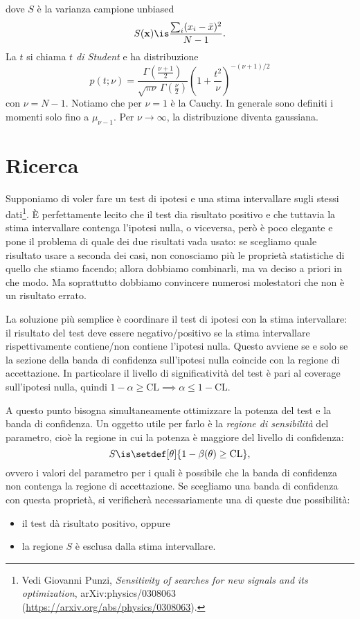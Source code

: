 dove $S$ è la varianza campione unbiased
\begin{equation*}
	S(\mathbf x)
	\is \frac {\sum_i (x_i-\bar x)^2} {N-1}.
\end{equation*}
La $t$ si chiama \emph{$t$ di Student} e ha distribuzione
\begin{equation*}
	p(t;\nu)
	= \frac {\Gamma\left(\frac{\nu+1}2\right)} {\sqrt{\pi\nu}\, \Gamma\left(\frac\nu2\right)}
	\left(1+\frac{t^2}\nu\right)^{-(\nu+1)/2}
\end{equation*}
con $\nu=N-1$.
Notiamo che per $\nu=1$ è la Cauchy.
In generale sono definiti i momenti solo fino a $\mu_{\nu-1}$.
Per $\nu\to\infty$, la distribuzione diventa gaussiana.

\section{Ricerca}

Supponiamo di voler fare un test di ipotesi e una stima intervallare sugli stessi dati\footnote{Vedi Giovanni Punzi, \emph{Sensitivity of searches for new signals and its optimization}, 	arXiv:physics/0308063 (\url{https://arxiv.org/abs/physics/0308063}).}.
È perfettamente lecito che il test dia risultato positivo
e che tuttavia la stima intervallare contenga l'ipotesi nulla, o viceversa,
però è poco elegante e pone il problema di quale dei due risultati vada usato:
se scegliamo quale risultato usare a seconda dei casi,
non conosciamo più le proprietà statistiche di quello che stiamo facendo;
allora dobbiamo combinarli, ma va deciso a priori in che modo.
Ma soprattutto dobbiamo convincere numerosi molestatori che non è un risultato errato.

La soluzione più semplice è coordinare il test di ipotesi con la stima intervallare:
il risultato del test deve essere negativo/positivo
se la stima intervallare rispettivamente contiene/non contiene l'ipotesi nulla.
Questo avviene se e solo se
la sezione della banda di confidenza sull'ipotesi nulla
coincide con la regione di accettazione.
In particolare il livello di significatività del test è pari al coverage sull'ipotesi nulla,
quindi $1-\alpha\ge\mathrm{CL} \implies \alpha\le1-\mathrm{CL}$.

A questo punto bisogna simultaneamente ottimizzare la potenza del test e la banda di confidenza.
Un oggetto utile per farlo è la \emph{regione di sensibilità} del parametro,
cioè la regione in cui la potenza è maggiore del livello di confidenza:
\begin{equation*}
	S \is \setdef[\theta]{1-\beta(\theta) \ge \mathrm{CL}},
\end{equation*}
ovvero i valori del parametro per i quali è possibile
che la banda di confidenza non contenga la regione di accettazione.
Se scegliamo una banda di confidenza con questa proprietà,
si verificherà necessariamente una di queste due possibilità:
\begin{itemize}
	\item il test dà risultato positivo, oppure
	\item la regione $S$ è esclusa dalla stima intervallare.
\end{itemize}
